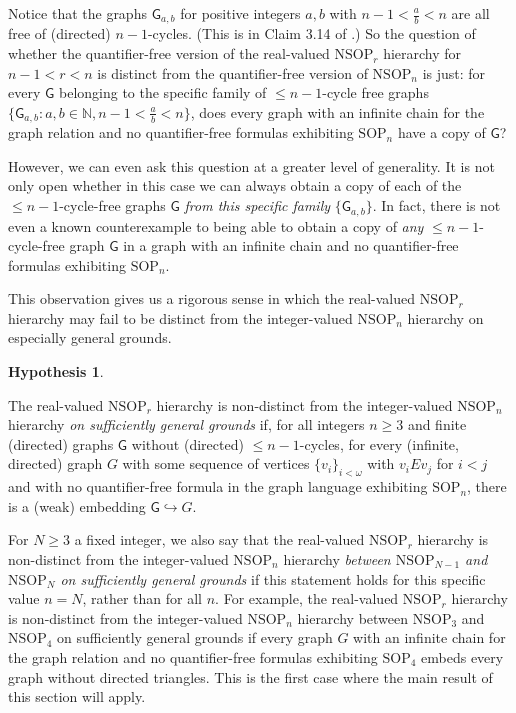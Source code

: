 \documentclass{amsart}
\theoremstyle{definition}
\newtheorem{hypothesis}[theorem]{Hypothesis}
\theoremstyle{remark}
\numberwithin{equation}{section}
\begin{document}
Notice that the graphs $\mathsf{G}_{a, b}$ for  positive integers $a, b$ with $n -1 < \frac{a}{b} < n$ are all free of (directed) $n-1$-cycles. (This is in Claim 3.14 of \cite{ApproxOrder}.) So the question of whether the quantifier-free version of the real-valued $\mathrm{NSOP}_{r}$ hierarchy for $n-1 < r < n$ is distinct from the quantifier-free version of $\mathrm{NSOP}_{n}$ is just: for every $\mathsf{G}$ belonging to the specific family of $\leq n-1$-cycle free graphs  $\{\mathsf{G}_{a, b}: a, b \in \mathbb{N}, n -1 < \frac{a}{b} < n\}$, does every graph with an infinite chain for the graph relation and no quantifier-free formulas exhibiting $\mathrm{SOP}_{n}$ have a copy of $\mathsf{G}$?

However, we can even ask this question at a greater level of generality. It is not only open whether in this case we can always obtain a copy of each of the $\leq n-1$-cycle-free graphs $\mathsf{G}$ \textit{from this specific family} $\{\mathsf{G}_{a, b}\}$. In fact, there is not even a known counterexample to being able to obtain a copy of \textit{any} $\leq n-1$-cycle-free graph $\mathsf{G}$ in a graph with an infinite chain and no quantifier-free formulas exhibiting $\mathrm{SOP}_{n}$.


This observation gives us a rigorous sense in which the real-valued $\mathrm{NSOP}_{r}$ hierarchy may fail to be distinct from the integer-valued $\mathrm{NSOP}_{n}$ hierarchy on especially general grounds.

\begin{hypothesis}\label{nondistinctness on sufficiently general grounds}

The real-valued $\mathrm{NSOP}_{r}$ hierarchy is non-distinct from the integer-valued $\mathrm{NSOP}_{n}$ hierarchy \textit{on sufficiently general grounds} if, for all integers $n \geq 3$ and finite (directed) graphs $\mathsf{G}$ without (directed) $\leq n-1$-cycles, for every (infinite, directed) graph $G$ with some sequence of vertices $\{v_{i}\}_{i < \omega}$ with $v_{i} E v_{j}$ for $i < j$ and with no quantifier-free formula in the graph language exhibiting $\mathrm{SOP}_{n}$, there is a (weak) embedding $\mathsf{G} \hookrightarrow G$.
\end{hypothesis}

For $N \geq 3$ a fixed integer, we also say that the real-valued $\mathrm{NSOP}_{r}$ hierarchy is non-distinct from the integer-valued $\mathrm{NSOP}_{n}$ hierarchy  \textit{between $\mathrm{NSOP}_{N-1}$ and $\mathrm{NSOP}_{N}$ on sufficiently general grounds} if this statement holds for this specific value $n= N$, rather than for all $n$. For example, the real-valued $\mathrm{NSOP}_{r}$ hierarchy is non-distinct from the integer-valued $\mathrm{NSOP}_{n}$ hierarchy between $\mathrm{NSOP}_{3}$ and $\mathrm{NSOP}_{4}$ on sufficiently general grounds if every graph $G$ with an infinite chain for the graph relation and no quantifier-free formulas exhibiting $\mathrm{SOP}_{4}$ embeds every graph without directed triangles. This is the first case where the main result of this section will apply.
\end{document}
